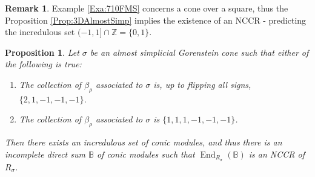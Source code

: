 \documentclass[reqno, 12pt]{amsart}
\newtheorem{proposition}[theorem]{Proposition}
\theoremstyle{definition}
\newtheorem{remark}[theorem]{Remark}
\numberwithin{equation}{section}
\newcommand{\Z}{\mathbb{Z}}
\newcommand{\End}{\operatorname{End}}
\begin{document}
\begin{remark}
    Example \ref{Exa:710FMS} concerns a cone over a square, thus the Proposition \ref{Prop:3DAlmostSimp} implies the existence of an NCCR - predicting the incredulous set $(-1,1]\cap \Z=\{0,1\}$.
\end{remark}



\begin{proposition}
    \label{Prop:SpecialCasesWithNCCR}
    Let $\sigma$ be an almost simplicial Gorenstein cone such that either of the following is true:
    \begin{enumerate}
        \item The collection of $\beta_\rho$ associated to $\sigma$ is, up to flipping all signs, $\{2,1,-1,-1,-1\}$.
        \item The collection of $\beta_\rho$ associated to $\sigma$ is $\{1,1,1,-1,-1,-1\}$.
    \end{enumerate}
    Then there exists an incredulous set of conic modules, and thus there is an incomplete direct sum $\mathbb{B}$ of conic modules such that $\End_{R_\sigma}(\mathbb{B})$ is an NCCR of $R_\sigma$.
\end{proposition}
\end{document}
